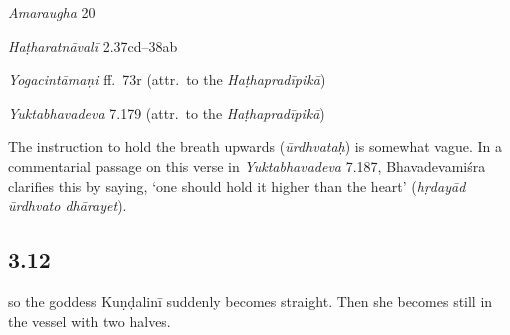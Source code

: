 \begin{ekdosis}
\begin{sources}[hp03_011]
\emph{Amaraugha} 20
\begin{versinnote}
\end{versinnote}
\end{sources}

\begin{testimonia}[hp03_011]
\emph{Haṭharatnāvalī} 2.37cd–38ab
\begin{versinnote}
\end{versinnote}

\emph{Yogacintāmaṇi} ff.~73r (attr.~to the \emph{Haṭhapradīpikā})
\begin{versinnote}
\end{versinnote}

\emph{Yuktabhavadeva} 7.179 (attr.~to the \emph{Haṭhapradīpikā})
\begin{versinnote}
\end{versinnote}
\end{testimonia}

\begin{philcomm}[hp03_011]
The instruction to hold the breath upwards (\emph{ūrdhvataḥ}) is somewhat vague. In a commentarial passage on this verse in \emph{Yuktabhavadeva} 7.187, Bhavadevamiśra clarifies this by saying, `one should hold it higher than the heart' (\emph{hṛdayād ūrdhvato dhārayet}).
\end{philcomm}

\subsection*{3.12}
\begin{translation}[hp03_012]
[\dots] so the goddess Kuṇḍalinī suddenly becomes straight. Then she becomes still in the vessel with two halves.
\end{translation}


\end{ekdosis}
